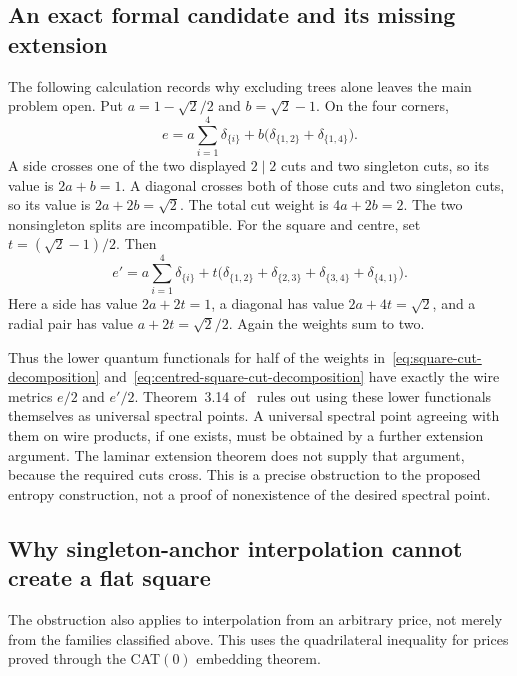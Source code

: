 \subsection{An exact formal candidate and its missing extension}
The following calculation records why excluding trees alone leaves the main problem open.
Put $a=1-\sqrt2/2$ and $b=\sqrt2-1$.  On the four corners,
\begin{equation}
 e=a\sum_{i=1}^{4}\delta_{\{i\}}
       +b\bigl(\delta_{\{1,2\}}+\delta_{\{1,4\}}\bigr).
 \label{eq:square-cut-decomposition}
\end{equation}
A side crosses one of the two displayed $2\mid2$ cuts and two singleton cuts, so its value is $2a+b=1$.  A diagonal crosses both of those cuts and two singleton cuts, so its value is $2a+2b=\sqrt2$.  The total cut weight is $4a+2b=2$.  The two nonsingleton splits are incompatible.
For the square and centre, set $t=(\sqrt2-1)/2$.  Then
\begin{equation}
 e'=a\sum_{i=1}^{4}\delta_{\{i\}}
       +t\bigl(\delta_{\{1,2\}}+\delta_{\{2,3\}}
                 +\delta_{\{3,4\}}+\delta_{\{4,1\}}\bigr).
 \label{eq:centred-square-cut-decomposition}
\end{equation}
Here a side has value $2a+2t=1$, a diagonal has value $2a+4t=\sqrt2$, and a radial pair has value $a+2t=\sqrt2/2$.  Again the weights sum to two.

Thus the lower quantum functionals for half of the weights in~\eqref{eq:square-cut-decomposition} and~\eqref{eq:centred-square-cut-decomposition} have exactly the wire metrics $e/2$ and $e'/2$.  Theorem~3.14 of~\cite{bcfln-quantum} rules out using these lower functionals themselves as universal spectral points.  A universal spectral point agreeing with them on wire products, if one exists, must be obtained by a further extension argument.  The laminar extension theorem does not supply that argument, because the required cuts cross.  This is a precise obstruction to the proposed entropy construction, not a proof of nonexistence of the desired spectral point.

\subsection{Why singleton-anchor interpolation cannot create a flat square}
The obstruction also applies to interpolation from an arbitrary price, not merely from the families classified above.  This uses the quadrilateral inequality for prices proved through the CAT$(0)$ embedding theorem.

